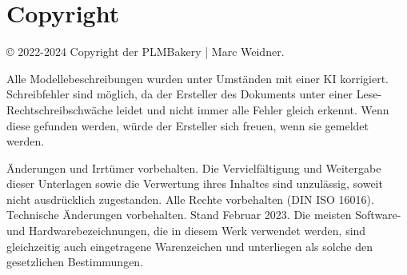 \newpage
\section{Copyright}
\begin{flushleft}
© 2022-2024 Copyright der PLMBakery | Marc Weidner.
\par
Alle Modellebeschreibungen wurden unter Umständen mit einer KI korrigiert. Schreibfehler sind möglich, da der Ersteller des Dokuments unter einer Lese-Rechtschreibschwäche leidet und nicht immer alle Fehler gleich erkennt. Wenn diese gefunden werden, würde der Ersteller sich freuen, wenn sie gemeldet werden.
\par
Änderungen und Irrtümer vorbehalten. Die Vervielfältigung und Weitergabe dieser Unterlagen sowie die Verwertung ihres Inhaltes sind unzulässig, soweit nicht ausdrücklich zugestanden. Alle Rechte vorbehalten (DIN ISO 16016). Technische Änderungen vorbehalten. Stand Februar 2023. Die meisten Software- und Hardwarebezeichnungen, die in diesem Werk verwendet werden, sind gleichzeitig auch eingetragene Warenzeichen und unterliegen als solche den gesetzlichen Bestimmungen.
\end{flushleft}